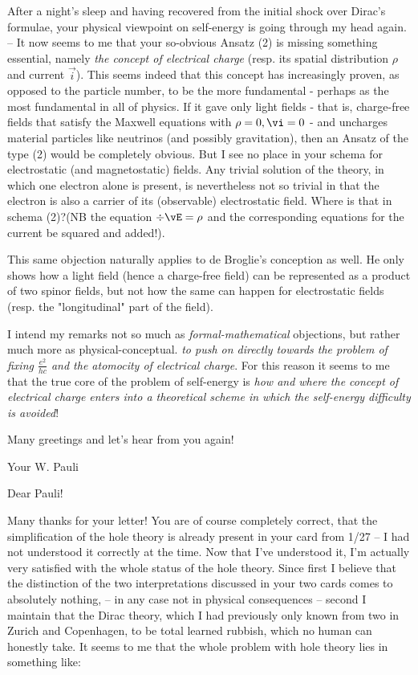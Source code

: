 \documentclass{article}
\begin{document}
After a night's sleep and having recovered from the initial shock over Dirac's formulae, your physical viewpoint on self-energy is going through my head again. -- It now seems to me that your so-obvious Ansatz (2) is missing something essential, namely \textit{the concept of electrical charge} (resp. its spatial distribution $\rho$ and current $\vec{i}$). This seems indeed that this concept has increasingly proven, as opposed to the particle number, to be the more fundamental - perhaps as the most fundamental in all of physics. If it gave only light fields - that is, charge-free fields that satisfy the Maxwell equations with $\rho=0,\vi=0$ - and uncharges material particles like neutrinos (and possibly gravitation), then an Ansatz of the type (2) would be completely obvious.
But I see no place in your schema for electrostatic (and magnetostatic) fields. Any trivial solution of the theory, in which one electron alone is present, is nevertheless not so trivial in that the electron is also a carrier of its (observable) electrostatic field. Where is that in schema (2)?(NB the equation $\div\vE = \rho$ and the corresponding equations for the current  be squared and added!).

This same objection naturally applies to de Broglie's conception as well. He only shows how a light field (hence a charge-free field) can be represented as a product of two spinor fields, but not how the same can happen for electrostatic fields (resp. the "longitudinal" part of the field).

I intend my remarks not so much as \textit{formal-mathematical} objections, but rather much more as physical-conceptual. \textit{ to push on directly towards the problem of fixing $\frac{e^2}{hc}$ and the atomocity of electrical charge}. For this reason it seems to me that the true core of the problem of self-energy is \textit{how and where the concept of electrical charge enters into a theoretical scheme in which the self-energy difficulty is avoided}!

Many greetings and let's hear from you again!

Your W. Pauli

\date{February 8, 1934}

Dear Pauli!

Many thanks for your letter! You are of course completely correct, that the simplification of the hole theory is already present in your card from 1/27 -- I had not understood it correctly at the time. Now that I've understood it, I'm actually very satisfied with the whole status of the hole theory. Since first I believe that the distinction of the two interpretations discussed in your two cards comes to absolutely nothing, -- in any case not in physical consequences -- second I maintain that the Dirac theory, which I had previously only known from two  in Zurich and Copenhagen, to be total learned rubbish, which no human can honestly take. It seems to me that the whole problem with hole theory lies in something like:
\end{document}
